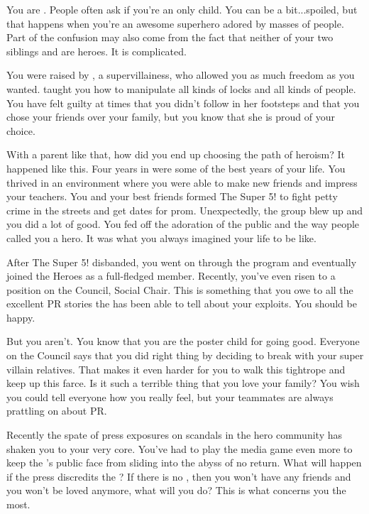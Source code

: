 \documentclass[char]{LRSguildcamp1}
\begin{document}
\name{\cYoungest{}}

You are \cYoungest{\MYsupername}. People often ask if you're an only child. You can be a bit...spoiled, but that happens when you're an awesome superhero adored by masses of people. Part of the confusion may also come from the fact that neither of your two siblings \cOldest{} and \cArchitect{} are heroes. It is complicated.  

You were raised by \cGrandma{\MYsupername}, a supervillainess, who allowed you as much freedom as you wanted. \cGrandma{} taught you how to manipulate all kinds of locks and all kinds of people. You have felt guilty at times that you didn't follow in her footsteps and that you chose your friends over your family, but you know that she is proud of your choice. 

With a parent like that, how did you end up choosing the path of heroism? It happened like this. Four years in \pSuperSchool{} were some of the best years of your life. You thrived in an environment where you were able to make new friends and impress your teachers. You and your best friends formed The Super 5! to fight petty crime in the streets and get dates for prom. Unexpectedly, the group blew up and you did a lot of good. You fed off the adoration of the public and the way people called you a hero. It was what you always imagined your life to be like.  
 
After The Super 5! disbanded, you went on through the \cHeroLeague{\intro} program and eventually joined the Heroes as a full-fledged member. Recently, you've even risen to a position on the Council, Social Chair. This is something that you owe to all the excellent PR stories the \cHeroLeague{} has been able to tell about your exploits. You should be happy. 

But you aren't. You know that you are the poster child for going good. Everyone on the Council says that you did right thing by deciding to break with your super villain relatives. That makes it even harder for you to walk this tightrope and keep up this farce. Is it such a terrible thing that you love your family? 
You wish you could tell everyone how you really feel, but your teammates are always prattling on about PR. 

Recently the spate of press exposures on scandals in the hero community has shaken you to your very core. You've had to play the media game even more to keep the \cHeroLeague{}'s public face from sliding into the abyss of no return. What will happen if the press discredits the \cHeroLeague{}? If there is no \cHeroLeague{}, then you won't have any friends and you won't be loved anymore, what will you do? This is what concerns you the most. 
\end{document}
